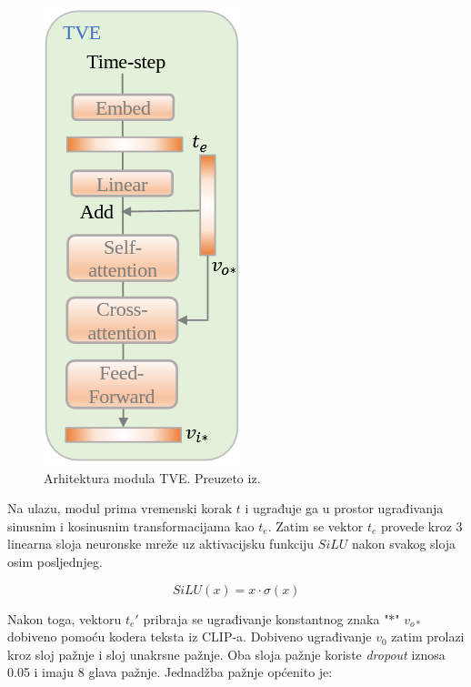 \begin{figure}[H]
    \centering
    \includegraphics[width=0.5\linewidth]{imgs/tve.png}
    \caption{Arhitektura modula TVE. Preuzeto iz\cite{huang2024musicstyletransferdiffusion}.}
    \label{fig:arhitektura_tve}
\end{figure}


Na ulazu, modul prima vremenski korak $t$ i ugrađuje ga u prostor ugrađivanja sinusnim i kosinusnim transformacijama kao $t_{e}$. Zatim se vektor $t_{e}$ provede kroz 3 linearna sloja neuronske mreže uz aktivacijsku funkciju $SiLU$ nakon svakog sloja osim posljednjeg.

\begin{equation}
    SiLU({x}) = {x} \cdot \sigma({x})
\end{equation}

Nakon toga, vektoru $t_{e}'$ pribraja se ugrađivanje konstantnog znaka "*" $v_{o*}$ dobiveno pomoću kodera teksta iz CLIP-a. Dobiveno ugrađivanje $v_0$ zatim prolazi kroz sloj pažnje i sloj unakrsne pažnje. Oba sloja pažnje koriste \textit{dropout} iznosa 0.05 i imaju 8 glava pažnje. Jednadžba pažnje općenito je:

